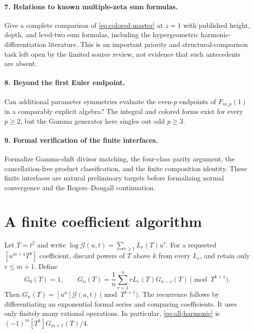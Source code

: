 \documentclass[11pt,a4paper]{article}
\numberwithin{equation}{section}
\theoremstyle{definition}\newtheorem{definition}[theorem]{Definition}
\theoremstyle{remark}\newtheorem{remark}[theorem]{Remark}
\newcommand{\Gcal}{\mathcal G}\newcommand{\Rcal}{\mathcal R}
\begin{document}
\paragraph{7. Relations to known multiple-zeta sum formulas.}
Give a complete comparison of \eqref{eq:colored-master} at $z=1$ with
published height, depth, and level-two sum formulas, including the
hypergeometric harmonic-differentiation literature. This is an important
priority and structural-comparison task left open by the limited source
review, not evidence that such antecedents are absent.

\paragraph{8. Beyond the first Euler endpoint.}
Can additional parameter symmetries evaluate the even-$p$ endpoints of
$F_{m,p}(1)$ in a comparably explicit algebra? The integral and colored
forms exist for every $p\ge2$, but the Gamma generator here singles out
odd $p\ge3$.

\paragraph{9. Formal verification of the finite interfaces.}
Formalize Gamma-shift divisor matching, the four-class parity argument,
the cancellation-free product classification, and the finite composition
identity. These finite interfaces are natural preliminary targets before
formalizing normal convergence and the Rogers--Dougall continuation.

\appendix
\section{A finite coefficient algorithm}
\label{app:algorithm}
Let $T=t^2$ and write
$\log\Gcal(u,t)=\sum_{r\ge1}L_r(T)u^r$.
For a requested $[u^{m+1}T^k]$ coefficient, discard powers of $T$ above
$k$ from every $L_r$, and retain only $r\le m+1$. Define
\begin{equation}
 G_0(T)=1,\qquad
 G_n(T)=\frac1n\sum_{r=1}^n rL_r(T)G_{n-r}(T)
                         \pmod{T^{k+1}}.
 \label{eq:coefficient-algorithm}
\end{equation}
Then $G_n(T)=[u^n]\Gcal(u,t)\pmod{T^{k+1}}$. The recurrence follows
by differentiating an exponential formal series and comparing coefficients.
It uses only finitely many rational operations. In particular,
\eqref{eq:all-harmonic} is $(-1)^m[T^k]G_{m+1}(T)/4$.
\end{document}
